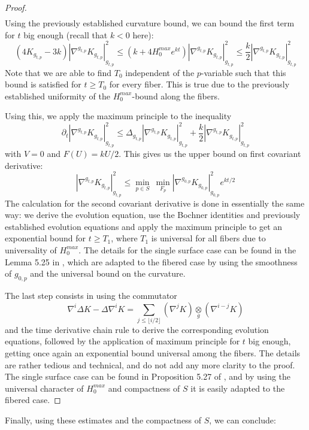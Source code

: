 \documentclass{article}
\theoremstyle{plain}
\theoremstyle{remark}
\theoremstyle{definition}
\begin{document}
\begin{proof}
\begin{multline*}
    \end{multline*}
    Using the previously established curvature bound, we can bound the first term for $t$ big enough (recall that $k<0$ here)\thinspace:
    $$(4K_{g_{t,p}}-3k)|\nabla^{g_{t,p}} K_{g_{t,p}}|^2_{g_{t,p}}\leq(k+4H_0^{max}e^{kt})|\nabla^{g_{t,p}} K_{g_{t,p}}|^2_{g_{t,p}}\leq \frac{k}{2}|\nabla^{g_{t,p}} K_{g_{t,p}}|^2_{g_{t,p}}$$
    Note that we are able to find $T_0$ independent of the $p$-variable such that this bound is satisfied for $t\geq T_0$ for every fiber. This is true due to the previously established uniformity of the $H_0^{max}$-bound along the fibers. \par 
    Using this, we apply the maximum principle to the inequality
    $$\partial_t|\nabla^{g_{t,p}} K_{g_{t,p}}|^2_{g_{t,p}}\leq \Delta_{g_{t,p}} |\nabla^{g_{t,p}} K_{g_{t,p}}|^2_{g_{t,p}}+\frac{k}{2} |\nabla^{g_{t,p}} K_{g_{t,p}}|^2_{g_{t,p}}$$
    with $V=0$ and $F(U)=kU/2$. This gives us the upper bound on first covariant derivative\thinspace:
    $$|\nabla^{g_{t,p}} K_{g_{t,p}}|^2_{g_{t,p}} \leq \underset{p\in S}{\min} \:\underset{F_p}{\min} |\nabla^{g_{0,p}} K_{g_{0,p}}|^2_{g_{0,p}} e^{kt/2}$$
    The calculation for the second covariant derivative is done in essentially the same way\thinspace: we derive the evolution equation, use the Bochner identities and previously established evolution equations and apply the maximum principle to get an exponential bound for $t\geq T_1$, where $T_1$ is universal for all fibers due to universality of $H_0^{max}$. The details for the single surface case can be found in the Lemma 5.25 in \cite{ChowKnopf}, which are adapted to the fibered case by using the smoothness of $g_{0,p}$ and the universal bound on the curvature. \par 
    The last step consists in using the commutator
    $$\nabla^i\Delta K - \Delta\nabla^i K = \sum_{j\leq \lfloor i/2 \rfloor} (\nabla^j K) \underset{g}{\otimes} (\nabla^{i-j} K) $$
    and the time derivative chain rule to derive the corresponding evolution equations, followed by the application of maximum principle for $t$ big enough, getting once again an exponential bound universal among the fibers. The details are rather tedious and technical, and do not add any more clarity to the proof. The single surface case can be found in Proposition 5.27 of \cite{ChowKnopf}, and by using the universal character of $H_0^{max}$ and compactness of $S$ it is easily adapted to the fibered case.
\end{proof}
Finally, using these estimates and the compactness of $S$, we can conclude\thinspace:
\end{document}
